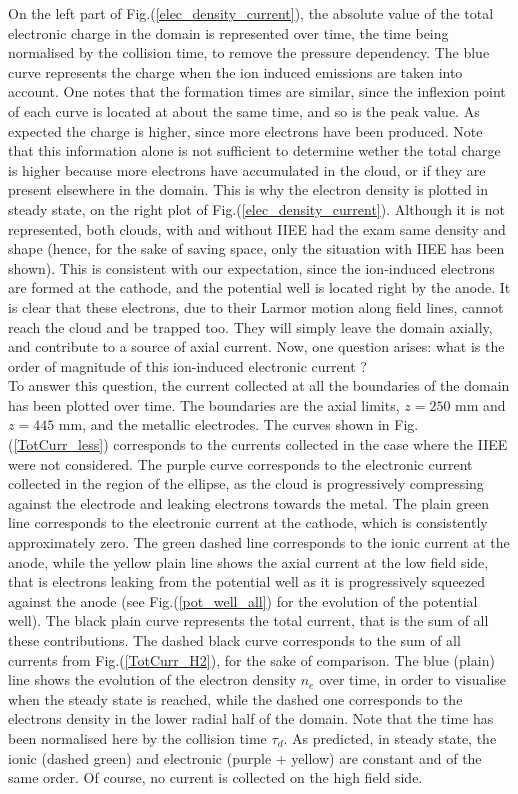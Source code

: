 On the left part of Fig.(\ref{elec_density_current}), the absolute value of the total electronic charge in the domain is represented over time, the time being normalised by the collision time, to remove the pressure dependency. The blue curve represents the charge when the ion induced emissions are taken into account. One notes that the formation times are similar, since the inflexion point of each curve is located at about the same time, and so is the peak value. As expected the charge is higher, since more electrons have been produced. Note that this information alone is not sufficient to determine wether the total charge is higher because more electrons have accumulated in the cloud, or if they are present elsewhere in the domain. This is why the electron density is plotted in steady state, on the right plot of Fig.(\ref{elec_density_current}). Although it is not represented, both clouds, with and without IIEE had the exam same density and shape (hence, for the sake of saving space, only the situation with IIEE has been shown). This is consistent with our expectation, since the ion-induced electrons are formed at the cathode, and the potential well is located right by the anode. It is clear that these electrons, due to their Larmor motion along field lines, cannot reach the cloud and be trapped too. They will simply leave the domain axially, and contribute to a source of axial current. Now, one question arises: what is the order of magnitude of this ion-induced electronic current ?\\ 

To answer this question, the current collected at all the boundaries of the domain has been plotted over time. The boundaries are the axial limits, $z=250$ mm and $z=445$ mm, and the metallic electrodes. The curves shown in Fig.(\ref{TotCurr_less}) corresponds to the currents collected in the case where the IIEE were not considered. The purple curve corresponds to the electronic current collected in the region of the ellipse, as the cloud is progressively compressing against the electrode and leaking electrons towards the metal. The plain green line corresponds to the electronic current at the cathode, which is consistently approximately zero. The green dashed line corresponds to the ionic current at the anode, while the yellow plain line shows the axial current at the low field side, that is electrons leaking from the potential well as it is progressively squeezed against the anode (see Fig.(\ref{pot_well_all}) for the evolution of the potential well). The black plain curve represents the total current, that is the sum of all these contributions. The dashed black curve corresponds to the sum of all currents from Fig.(\ref{TotCurr_H2}), for the sake of comparison. The blue (plain) line shows the evolution of the electron density $n_e$ over time, in order to visualise when the steady state is reached, while the dashed one corresponds to the electrons density in the lower radial half of the domain. Note that the time has been normalised here by the collision time $\tau_d$. As predicted, in steady state, the ionic (dashed green) and electronic (purple + yellow) are constant  and of the same order. Of course, no current is collected on the high field side. \\

